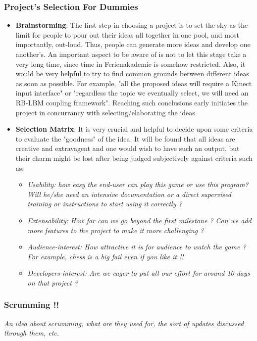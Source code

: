\subsubsection{Project's Selection For Dummies}
\begin{itemize}
\item \textbf{Brainstorming}: The first step in choosing a project is to set the sky as the limit for people to pour out their ideas all together in one pool, and most importantly, out-loud. Thus, people can generate more ideas and develop one another's. An important aspect to be aware of is not to let this stage take a very long time, since time in Ferienakademie is somehow restricted. Also, it would be very helpful to try to find common grounds between different ideas as soon as possible. For example, "all the proposed ideas will require a Kinect input interface" or "regardless the topic we eventually select, we will need an RB-LBM coupling framework". Reaching such conclusions early initiates the project in concurrancy with selecting/elaborating the ideas

\item \textbf{Selection Matrix}: It is very crucial and helpful to decide upon some criteria to evaluate the "goodness" of the idea. It will be found that all ideas are creative and extravagent and one would wish to have such an output, but their charm might be lost after being judged subjectively against criteria such as:
\begin{itemize}
\item \textit{Usability: how easy the end-user can play this game or use this program? Will he/she need an intensive documentation or a direct supervised training or instructions to start using it correctly ?}
\item \textit{Extensability: How far can we go beyond the first milestone ? Can we add more features to the project to make it more challenging ?}
\item \textit{Audience-interest: How attractive it is for audience to watch the game ? For example, chess is a big fail even if you like it !!}
\item \textit{Developers-interest: Are we eager to put all our effort for around 10-days on that project ?}
\end{itemize}
\end{itemize}


\subsubsection{Scrumming !!}
\textit{An idea about scrumming, what are they used for, the sort of updates discussed through them, etc.}

